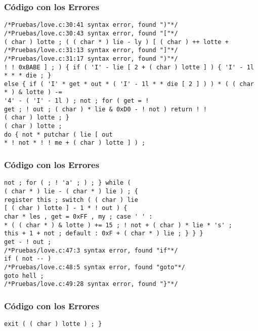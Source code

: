 \documentclass{beamer}
\begin{document}
\begin{frame}[fragile]
\frametitle{C\'odigo con los Errores}
\begin{lstlisting}[style=CStyle]
/*Pruebas/love.c:30:41 syntax error, found ")"*/
/*Pruebas/love.c:30:43 syntax error, found "["*/
( char ) lotte ; ( ( char * ) lie - ly ) [ ( char ) ++ lotte + 
/*Pruebas/love.c:31:13 syntax error, found "]"*/
/*Pruebas/love.c:31:17 syntax error, found ")"*/
! ! 0xBABE ] ; ) { if ( 'I' - lie [ 2 + ( char ) lotte ] ) { 'I' - 1l * * * die ; } 
else { if ( 'I' * get * out * ( 'I' - 1l * * die [ 2 ] ) ) * ( ( char * ) & lotte ) -= 
'4' - ( 'I' - 1l ) ; not ; for ( get = ! 
get ; ! out ; ( char ) * lie & 0xD0 - ! not ) return ! ! 
( char ) lotte ; } 
( char ) lotte ; 
do { not * putchar ( lie [ out 
* ! not * ! ! me + ( char ) lotte ] ) ; 
\end{lstlisting}
\end{frame}
\begin{frame}[fragile]
\frametitle{C\'odigo con los Errores}
\begin{lstlisting}[style=CStyle]
not ; for ( ; ! 'a' ; ) ; } while ( 
( char * ) lie - ( char * ) lie ) ; { 
register this ; switch ( ( char ) lie 
[ ( char ) lotte ] - 1 * ! out ) { 
char * les , get = 0xFF , my ; case ' ' : 
* ( ( char * ) & lotte ) += 15 ; ! not + ( char ) * lie * 's' ; 
this + 1 + not ; default : 0xF + ( char * ) lie ; } } } 
get - ! out ; 
/*Pruebas/love.c:47:3 syntax error, found "if"*/
if ( not -- ) 
/*Pruebas/love.c:48:5 syntax error, found "goto"*/
goto hell ; 
/*Pruebas/love.c:49:28 syntax error, found "}"*/
\end{lstlisting}
\end{frame}
\begin{frame}[fragile]
\frametitle{C\'odigo con los Errores}
\begin{lstlisting}[style=CStyle]
exit ( ( char ) lotte ) ; } \end{lstlisting}
\end{frame}
\end{document}
